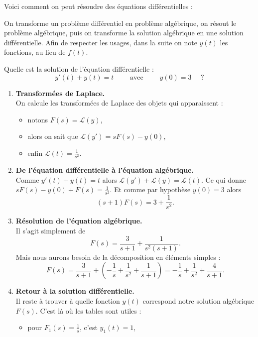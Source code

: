 \documentclass[class=report,crop=false]{standalone}
\begin{document}
Voici comment on peut résoudre des équations différentielles :



On transforme un problème différentiel en problème algébrique,
on résout le problème algébrique, puis on transforme la solution algébrique
en une solution différentielle.
Afin de respecter les usages, dans la suite on note $y(t)$ les fonctions, 
au lieu de $f(t)$.

\begin{exemple}
Quelle est la solution de l'équation différentielle :
$$y'(t) + y(t) = t \qquad \text{ avec }\qquad y(0) = 3 \quad \text{ ?}$$

\begin{enumerate}
  \item \textbf{Transformées de Laplace.}\\
  On calcule les transformées de Laplace des objets qui apparaissent :
  \begin{itemize}
    \item notons $F(s) = \mathcal{L}(y)$,
    \item alors on sait que $\mathcal{L}(y') = sF(s)-y(0)$,
    \item enfin $\mathcal{L}(t) = \frac{1}{s^2}$.
  \end{itemize}
  
  \item \textbf{De l'équation différentielle à l'équation algébrique.}\\ 
  Comme $y'(t) + y(t) = t$ alors
  $\mathcal{L}(y') + \mathcal{L}(y) = \mathcal{L}(t)$.
  Ce qui donne $sF(s)-y(0) + F(s) = \frac{1}{s^2}$.
  Et comme par hypothèse $y(0)= 3$ alors 
  $$(s+1)F(s) = 3 + \frac{1}{s^2}.$$
  
  \item \textbf{Résolution de l'équation algébrique.}\\  
  Il s'agit simplement de 
  $$F(s) = \frac{3}{s+1} + \frac{1}{s^2(s+1)}.$$
  Mais nous aurons besoin de la décomposition en éléments simples :
  $$F(s) = \frac{3}{s+1} + \left(-\frac{1}{s}+\frac{1}{s^2}+\frac{1}{s+1} \right)
   =  -\frac{1}{s}+\frac{1}{s^2}+\frac{4}{s+1}.$$

  \item \textbf{Retour à la solution différentielle.}\\
  Il reste à trouver à quelle fonction $y(t)$ correspond notre solution algébrique $F(s)$.
  C'est là où les tables sont utiles :
  \begin{itemize}
    \item pour $F_1(s) = \frac{1}{s}$, c'est $y_1(t) = 1$,
    

\end{itemize}
\end{enumerate}
\end{exemple}
\end{document}
